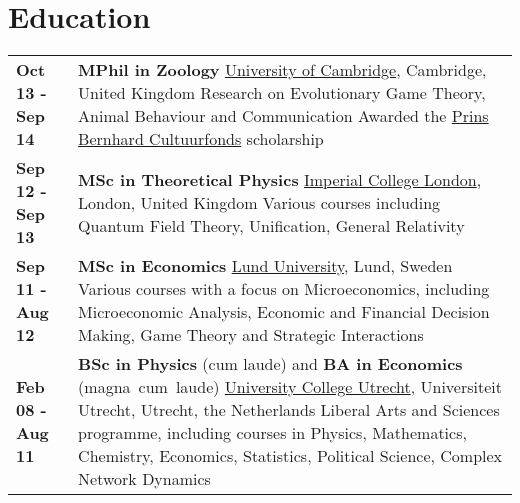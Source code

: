 \documentclass[a4paper,8pt]{extarticle}
\begin{document}
\vspace{-1mm}

\section*{Education}

\begin{center}
\setlength{\tabcolsep}{0mm}
\begin{tabular}{p{}p{}}
\textbf{Oct 13 - Sep 14}&\textbf{MPhil in Zoology}\newline
\href{https://www.zoo.cam.ac.uk}{University of Cambridge}, Cambridge, United Kingdom\newline
Research on Evolutionary Game Theory, Animal Behaviour and Communication\newline
Awarded the \href{http://www.prinsbernhardcultuurfonds.nl}{Prins Bernhard Cultuurfonds} scholarship
\vspace{2mm}\\
\textbf{Sep 12 - Sep 13}&\textbf{MSc in Theoretical Physics}\newline
\href{https://www.imperial.ac.uk}{Imperial College London}, London, United Kingdom\newline
Various courses including Quantum Field Theory, Unification, General Relativity
\vspace{2mm}\\
\textbf{Sep 11 - Aug 12}&\textbf{MSc in Economics}\newline
\href{http://www.lunduniversity.lu.se}{Lund University}, Lund, Sweden\newline
Various courses with a focus on Microeconomics, including Microeconomic Analysis, Economic and Financial Decision Making, Game Theory and Strategic Interactions
\vspace{2mm}\\
\textbf{Feb 08 - Aug 11}&\textbf{BSc in Physics} (cum laude) and \textbf{BA in Economics} (magna~cum~laude)\newline
\href{https://www.uu.nl/en/organisation/university-college-utrecht/}{University College Utrecht}, Universiteit Utrecht, Utrecht, the Netherlands\newline
Liberal Arts and Sciences programme, including courses in Physics, Mathematics, Chemistry, Economics, Statistics, Political Science, Complex Network Dynamics\newline

\end{tabular}
\end{center}
\end{document}
